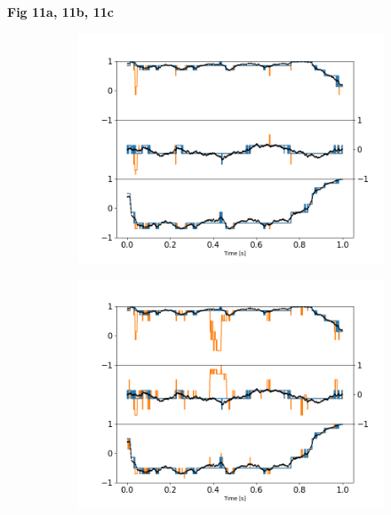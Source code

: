 \documentclass[final,  3p]{elsarticle}
\begin{document}
\begin{center}
	\bf{Fig 11a, 11b, 11c}
\end{center}
\begin{figure}[h]
	\centering
	\begin{subfigure}{0.32\textwidth}
		\subcaption{}
		\includegraphics[width=\textwidth]{./Images/fig11a.png}
	\end{subfigure}
	\begin{subfigure}{0.32\textwidth}
		\subcaption{}
		\includegraphics[width=\textwidth]{./Images/fig11b.png}
	\end{subfigure}
	\begin{subfigure}{0.32\textwidth}
		\subcaption{}

\end{subfigure}
\end{figure}
\end{document}
